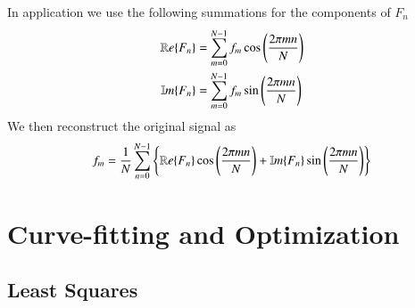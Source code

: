 \documentclass[12pt, a4paper, oneside, openright, titlepage]{book}
\begin{document}
\begin{proc}
        In application we use the following summations for the components of $F_n$ \begin{align}
                \mathbb R e\{F_n\} &= \sum_{m=0}^{N-1}f_m\cos\left(\frac{2\pi mn}{N}\right) \\
                \mathbb{I}m\{F_n\} &= \sum_{m=0}^{N-1}f_m\sin\left(\frac{2\pi mn}{N}\right)
        \end{align}
        We then reconstruct the original signal as \begin{equation}
                f_m = \frac{1}{N}\sum_{n=0}^{N-1}\left\{\mathbb R e\{F_n\}\cos\left(\frac{2\pi mn}{N}\right) + \mathbb{I}m\{F_n\}\sin\left(\frac{2\pi mn}{N}\right)\right\}
        \end{equation}
\end{proc}




\chapter{Curve-fitting and Optimization}


\section{Least Squares}
\end{document}
